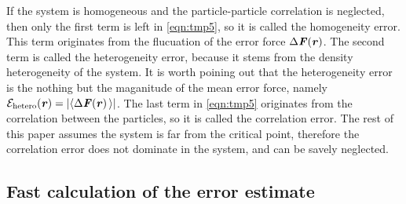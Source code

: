 \documentclass[aps,pre,preprint]{revtex4}
\renewcommand{\v}[1]{\textbf{\textit{#1}}}
\begin{document}
If the system is homogeneous and the particle-particle correlation is
neglected, then only the first term is left in \eqref{eqn:tmp5}, so it
is called the homogeneity error.  This term originates from the
flucuation of the error force $\Delta\v F(\v r)$.  The second term is
called the heterogeneity error, because it stems from the density
heterogeneity of the system. It is worth poining out that the
heterogeneity error is the nothing but the maganitude of the mean error force,
namely $\mathcal E_{\textrm{hetero}}(\v r) = \vert\langle\Delta\v F(\v
r)\,\rangle\vert$.  The last term in \eqref{eqn:tmp5} originates from the
correlation between the particles, so it is called the correlation
error.
The rest of this paper
assumes the system is far from the critical point, therefore the
correlation error does not dominate in the system, and can be savely
neglected.



\subsection{Fast calculation of the error estimate}\label{sec:tmp1.3}
\end{document}
